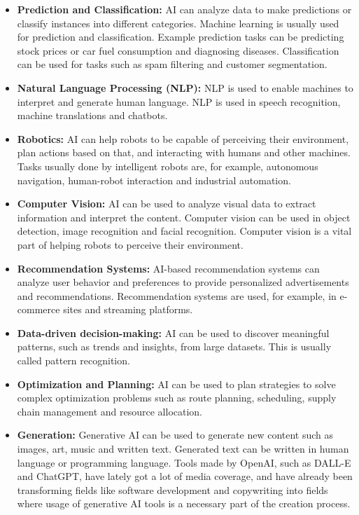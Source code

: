 \begin{itemize}
  \item \textbf{Prediction and Classification:} AI can analyze data to make predictions or classify instances into different categories. Machine learning is usually used for prediction and classification. Example prediction tasks can be predicting stock prices or car fuel consumption and diagnosing diseases. Classification can be used for tasks such as spam filtering and customer segmentation.
  \item \textbf{Natural Language Processing (NLP):} NLP is used to enable machines to interpret and generate human language. NLP is used in speech recognition, machine translations and chatbots.
  \item \textbf{Robotics:} AI can help robots to be capable of perceiving their environment, plan actions based on that, and interacting with humans and other machines. Tasks usually done by intelligent robots are, for example, autonomous navigation, human-robot interaction and industrial automation.
  \item \textbf{Computer Vision:} AI can be used to analyze visual data to extract information and interpret the content. Computer vision can be used in object detection, image recognition and facial recognition. Computer vision is a vital part of helping robots to perceive their environment.
  \item \textbf{Recommendation Systems:} AI-based recommendation systems can analyze user behavior and preferences to provide personalized advertisements and recommendations. Recommendation systems are used, for example, in e-commerce sites and streaming platforms.
  \item \textbf{Data-driven decision-making:} AI can be used to discover meaningful patterns, such as trends and insights, from large datasets. This is usually called pattern recognition.
  \item \textbf{Optimization and Planning:} AI can be used to plan strategies to solve complex optimization problems such as route planning, scheduling, supply chain management and resource allocation. 
  \item \textbf{Generation:} Generative AI can be used to generate new content such as images, art, music and written text. Generated text can be written in human language or programming language. Tools made by OpenAI, such as DALL-E and ChatGPT, have lately got a lot of media coverage, and have already been transforming fields like software development and copywriting into fields where usage of generative AI tools is a necessary part of the creation process.
\end{itemize}

